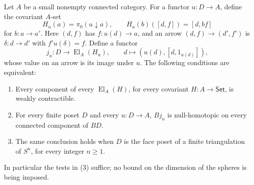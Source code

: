 \begin{theorem}\label{FT:finite-test}
Let $A$ be a small nonempty connected category. For a functor
$u:D\to A$, define the covariant $A$-set
\[
 H_u(a)=\pi_0(u\downarrow a),\qquad
 H_u(b)([d,f])=[d,bf]
\]
for $b:a\to a'$. Here $(d,f)$ has $f:u(d)\to a$, and an arrow
$(d,f)\to(d',f')$ is $\delta:d\to d'$ with $f'u(\delta)=f$.
Define a functor
\[
 j_u:D\longrightarrow\operatorname{El}_A(H_u),\qquad
 d\longmapsto(u(d),[d,1_{u(d)}]),
\]
whose value on an arrow is its image under $u$. The following conditions
are equivalent:
\begin{enumerate}
\item Every component of every $\operatorname{El}_A(H)$, for every
covariant $H:A\to\mathsf{Set}$, is weakly contractible.
\item For every finite poset $D$ and every $u:D\to A$, $Bj_u$ is
null-homotopic on every connected component of $BD$.
\item The same conclusion holds when $D$ is the face poset of a finite
triangulation of $S^n$, for every integer $n\geq1$.
\end{enumerate}
In particular the tests in (3) suffice; no bound on the dimension of the
spheres is being imposed.
\end{theorem}

